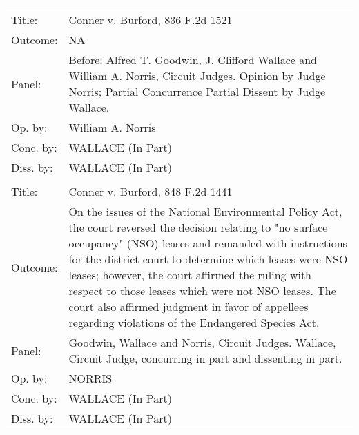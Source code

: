 \documentclass[10pt, letterpaper]{article}
\begin{document}
\begin{spacing}{1.0}
\begin{footnotesize}
\begin{longtable}[H]{lp{6in}}
        \arrayrulecolor{black}\hline\\[-4pt]
        Title: & Conner v. Burford, 836 F.2d 1521\\[2pt]
        Outcome: & NA\\[2pt]
        Panel: & Before: Alfred T. Goodwin, J. Clifford Wallace and William A. Norris, Circuit Judges. Opinion by Judge Norris; Partial Concurrence Partial Dissent by Judge Wallace.  \\[2pt]
        Op. by: & William A. Norris\\[2pt]
        Conc. by: & WALLACE (In Part) \\[2pt]
        Diss. by: &  WALLACE (In Part) \\[2pt]
        \arrayrulecolor{gray}\hline\\[-4pt]
        Title: & Conner v. Burford, 848 F.2d 1441\\[2pt]
        Outcome: & On the issues of the National Environmental Policy Act, the court reversed the decision relating to "no surface occupancy" (NSO) leases and remanded with instructions for the district court to determine which leases were NSO leases; however, the court affirmed the ruling with respect to those leases which were not NSO leases. The court also affirmed judgment in favor of appellees regarding violations of the Endangered Species Act.\\[2pt]
        Panel: &  Goodwin, Wallace and Norris, Circuit Judges.  Wallace, Circuit Judge, concurring in part and dissenting in part.  \\[2pt]
        Op. by: & NORRIS \\[2pt]
        Conc. by: & WALLACE (In Part) \\[2pt]
        Diss. by: & WALLACE (In Part) \\[2pt]
        

\end{longtable}
\end{footnotesize}
\end{spacing}
\end{document}
